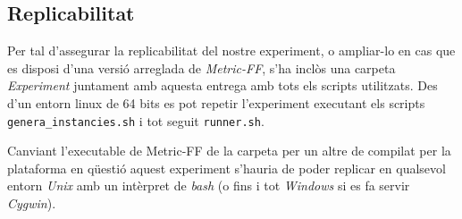 \documentclass[11pt,a4paper]{article}
\begin{document}
\subsection{Replicabilitat}

Per tal d'assegurar la replicabilitat del nostre experiment, o ampliar-lo en cas que es disposi d'una versió arreglada de \emph{Metric-FF}, s'ha inclòs una carpeta \emph{Experiment} juntament amb aquesta entrega amb tots els scripts utilitzats. Des d'un entorn linux de 64 bits es pot repetir l'experiment executant els scripts \texttt{genera\_instancies.sh} i tot seguit \texttt{runner.sh}. 

Canviant l'executable de Metric-FF de la carpeta per un altre de compilat per la plataforma en qüestió aquest experiment s'hauria de poder replicar en qualsevol entorn \emph{Unix} amb un intèrpret de \emph{bash} (o fins i tot \emph{Windows} si es fa servir \emph{Cygwin}).
\end{document}
